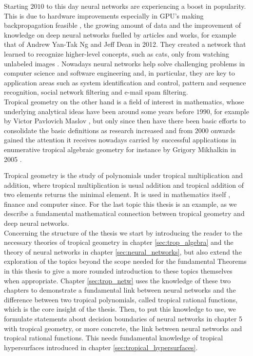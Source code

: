 \documentclass{article}
\theoremstyle{definition}
\begin{document}
Starting $2010$ to this day neural networks are experiencing a boost in popularity. This is due to hardware improvements especially in GPU's making backpropagation feasible \cite{cirecsan2010deep}, the growing amount of data and the improvement of knowledge on deep neural networks fuelled by articles and works, for example that of Andrew Yan-Tak Ng and Jeff Dean in 2012. They created a network that learned to recognize higher-level concepts, such as cats, only from watching unlabeled images \cite{DBLP:journals/corr/abs-1112-6209}. Nowadays neural networks help solve challenging problems in computer science and software engineering and, in particular, they are key to application areas such as system identification and control, pattern and sequence recognition, social network filtering and e-mail spam filtering. \\
Tropical geometry on the other hand is a field of interest in mathematics, whose underlying analytical ideas have been around some years before $1990$, for example by Victor Pavlovich Maslov \cite{maslov1985new}, but only since then have there been basic efforts to consolidate the basic definitions as research increased and from $2000$ onwards gained the attention it receives nowadays carried by successful applications in enumerative tropical algebraic geometry for instance by Grigory Mikhalkin in 2005 \cite{mikhalkin2005enumerative}.

Tropical geometry is the study of polynomials under tropical multiplication and addition, where tropical multiplication is usual addition and tropical addition of two elements returns the minimal element. It is used in mathematics itself \cite{krivulin2014tropical}, finance \cite{klemperer2009new} and computer since. For the last topic this thesis is an example, as we describe a fundamental mathematical connection between tropical geometry and deep neural networks. \\

Concerning the structure of the thesis we start by introducing the reader to the necessary theories of tropical geometry in chapter \ref{sec:trop_algebra} and the theory of neural networks in chapter \ref{sec:neural_networks}, but also extend the exploration of the topics beyond the scope needed for the fundamental Theorems in this thesis to give a more rounded introduction to these topics themselves when appropriate. Chapter \ref{sec:trop_netw} uses the knowledge of these two chapters to demonstrate a fundamental link between neural networks and the difference between two tropical polynomials, called tropical rational functions, which is the core insight of the thesis.
Then, to put this knowledge to use, we formulate statements about decision boundaries of neural networks in chapter 5 with tropical geometry, or more concrete, the link between neural networks and tropical rational functions. This needs fundamental knowledge of tropical hypersurfaces introduced in chapter \ref{sec:tropical_hypersurfaces}. \\
\end{document}
